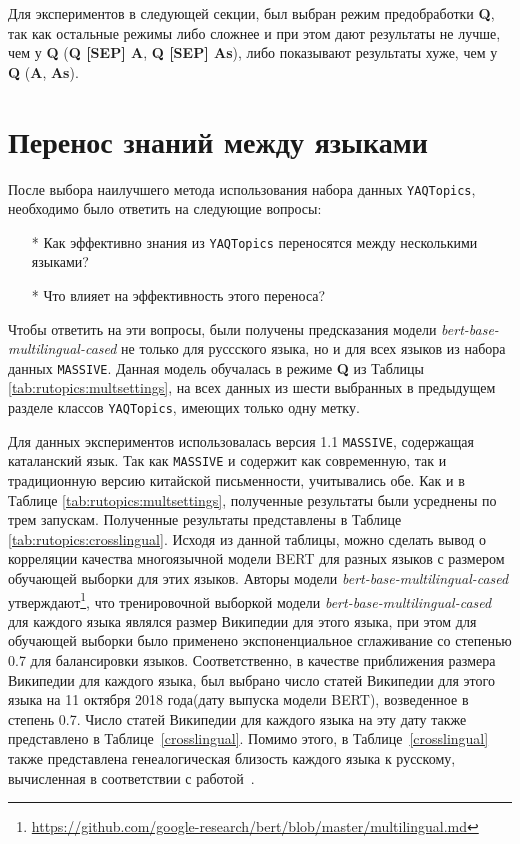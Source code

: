 Для экспериментов в следующей секции, был выбран режим предобработки \textbf{Q}, так как остальные режимы либо сложнее и при этом дают результаты не лучше, чем у \textbf{Q} (\textbf{Q [SEP] A}, \textbf{Q [SEP] As}), либо показывают результаты хуже, чем у \textbf{Q} (\textbf{A}, \textbf{As}).





\section{Перенос знаний между языками}
После выбора наилучшего метода использования набора данных \texttt{YAQTopics}, необходимо было ответить на следующие вопросы:
\begin{itemize}
\item[*]Как эффективно знания из \texttt{YAQTopics} переносятся между несколькими языками?
\item[*]Что влияет на эффективность этого переноса?
\end{itemize}
Чтобы ответить на эти вопросы, были получены предсказания модели \textit{bert-base-multilingual-cased} не только для руссского языка, но и для всех языков из набора данных \texttt{MASSIVE}. Данная модель обучалась в режиме \textbf{Q} из Таблицы \ref{tab:rutopics:multsettings}, на всех данных из шести выбранных в предыдущем разделе классов \texttt{YAQTopics}, имеющих только одну метку. 

Для данных экспериментов использовалась версия 1.1 \texttt{MASSIVE}, содержащая каталанский язык. Так как \texttt{MASSIVE} и содержит как современную, так и традиционную версию китайской письменности, учитывались обе. Как и в Таблице \ref{tab:rutopics:multsettings}, полученные результаты были усреднены по трем запускам.
Полученные результаты представлены в Таблице \ref{tab:rutopics:crosslingual}. Исходя из данной таблицы, можно сделать вывод о корреляции качества многоязычной модели BERT для разных языков с размером обучающей выборки для этих языков. Авторы модели \textit{bert-base-multilingual-cased} утверждают\footnote{\url{https://github.com/google-research/bert/blob/master/multilingual.md}}, что тренировочной выборкой модели \textit{bert-base-multilingual-cased} для каждого языка являлся размер Википедии для этого языка, при этом для обучающей выборки было применено экспоненциальное сглаживание со степенью 0.7 для балансировки языков.
Соответственно, в качестве приближения размера Википедии для каждого языка, был выбрано число статей Википедии для этого языка на 11 октября 2018 года(дату выпуска модели BERT), возведенное в степень 0.7.  Число статей Википедии для каждого языка на эту дату также представлено в Таблице~\ref{crosslingual}. Помимо этого, в Таблице~\ref{crosslingual} также представлена генеалогическая близость каждого языка к русскому, вычисленная в соответствии с работой~\cite{lang_sim}. 

